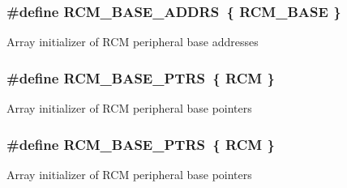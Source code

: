 \subsubsection[{\texorpdfstring{R\+C\+M\+\_\+\+B\+A\+S\+E\+\_\+\+A\+D\+D\+RS}{RCM_BASE_ADDRS}}]{\setlength{\rightskip}{0pt plus 5cm}\#define R\+C\+M\+\_\+\+B\+A\+S\+E\+\_\+\+A\+D\+D\+RS~\{ {\bf R\+C\+M\+\_\+\+B\+A\+SE} \}}\hypertarget{group__RCM__Peripheral__Access__Layer_gaf3db57eb66e9dc48fcac7ebf4e6884c6}{}\label{group__RCM__Peripheral__Access__Layer_gaf3db57eb66e9dc48fcac7ebf4e6884c6}
Array initializer of R\+CM peripheral base addresses 
\subsubsection[{\texorpdfstring{R\+C\+M\+\_\+\+B\+A\+S\+E\+\_\+\+P\+T\+RS}{RCM_BASE_PTRS}}]{\setlength{\rightskip}{0pt plus 5cm}\#define R\+C\+M\+\_\+\+B\+A\+S\+E\+\_\+\+P\+T\+RS~\{ {\bf R\+CM} \}}\hypertarget{group__RCM__Peripheral__Access__Layer_gad8549fec4a09b0b485983beadfc3a5fb}{}\label{group__RCM__Peripheral__Access__Layer_gad8549fec4a09b0b485983beadfc3a5fb}
Array initializer of R\+CM peripheral base pointers 
\subsubsection[{\texorpdfstring{R\+C\+M\+\_\+\+B\+A\+S\+E\+\_\+\+P\+T\+RS}{RCM_BASE_PTRS}}]{\setlength{\rightskip}{0pt plus 5cm}\#define R\+C\+M\+\_\+\+B\+A\+S\+E\+\_\+\+P\+T\+RS~\{ {\bf R\+CM} \}}\hypertarget{group__RCM__Peripheral__Access__Layer_gad8549fec4a09b0b485983beadfc3a5fb}{}\label{group__RCM__Peripheral__Access__Layer_gad8549fec4a09b0b485983beadfc3a5fb}
Array initializer of R\+CM peripheral base pointers 